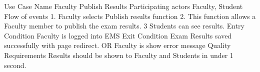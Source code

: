 Use Case Name	Faculty Publish Results
Participating actors	 Faculty, Student
Flow of events	
1. Faculty selects Publish results function
2. This function allows a Faculty member to publish the exam results.
3 Students can see results.
Entry Condition	Faculty is logged into EMS
Exit Condition	Exam Results saved successfully with page redirect.
OR
Faculty is show error message 
Quality Requirements	Results should be shown to Faculty and Students in under 1 second.
	
